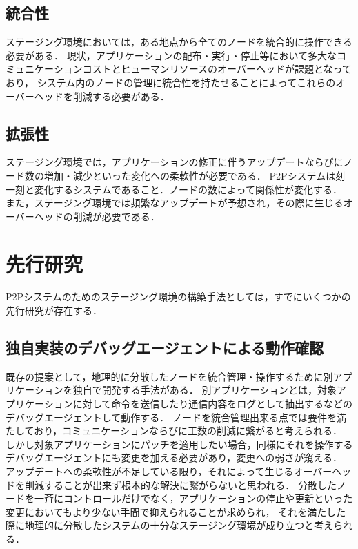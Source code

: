 \subsection{統合性}
\label{issue:requirements2}
ステージング環境においては，ある地点から全てのノードを統合的に操作できる必要がある．
現状，アプリケーションの配布・実行・停止等において多大なコミュニケーションコストとヒューマンリソースのオーバーヘッドが課題となっており，
システム内のノードの管理に統合性を持たせることによってこれらのオーバーヘッドを削減する必要がある．

\subsection{拡張性}
\label{issue:requirements3}
ステージング環境では，アプリケーションの修正に伴うアップデートならびにノード数の増加・減少といった変化への柔軟性が必要である．
P2Pシステムは刻一刻と変化するシステムであること．ノードの数によって関係性が変化する．
また，ステージング環境では頻繁なアップデートが予想され，その際に生じるオーバーヘッドの削減が必要である．

\section{先行研究}
\label{issue:previous-research}

P2Pシステムのためのステージング環境の構築手法としては，すでにいくつかの先行研究が存在する．

\subsection{独自実装のデバッグエージェントによる動作確認}
既存の提案として，地理的に分散したノードを統合管理・操作するために別アプリケーションを独自で開発する手法がある．
別アプリケーションとは，対象アプリケーションに対して命令を送信したり通信内容をログとして抽出するなどのデバッグエージェントして動作する．
ノードを統合管理出来る点では要件を満たしており，コミュニケーションならびに工数の削減に繋がると考えられる．
しかし対象アプリケーションにパッチを適用したい場合，同様にそれを操作するデバッグエージェントにも変更を加える必要があり，変更への弱さが窺える．
アップデートへの柔軟性が不足している限り，それによって生じるオーバーヘッドを削減することが出来ず根本的な解決に繋がらないと思われる．
分散したノードを一斉にコントロールだけでなく，アプリケーションの停止や更新といった変更においてもより少ない手間で抑えられることが求められ，
それを満たした際に地理的に分散したシステムの十分なステージング環境が成り立つと考えられる．

